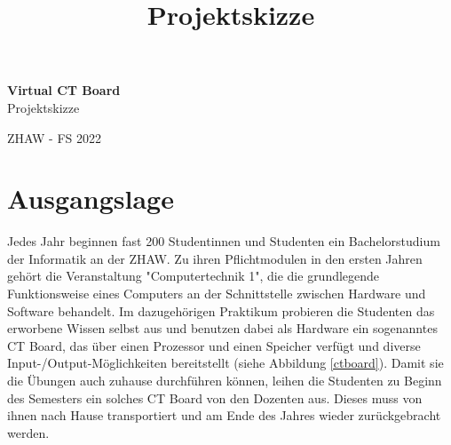 \documentclass[10pt]{article}
\title{Projektskizze}
\begin{document}
\begin{titlepage}

\raggedleft %
	
	\vspace*{\baselineskip} %
	
	
	\vspace*{0.167\textheight} %
	
	\textbf{\LARGE Virtual CT Board}\\[\baselineskip] %
	
	\Huge Projektskizze\\[\baselineskip] %
	
	\vfill %
	
	{\large ZHAW - FS 2022}
	
	\vspace*{3\baselineskip} %


\end{titlepage}

\tableofcontents

\newpage 

\section{Ausgangslage}

Jedes Jahr beginnen fast 200 Studentinnen und Studenten ein Bachelorstudium der Informatik an der ZHAW. Zu ihren Pflichtmodulen in den ersten Jahren gehört die Veranstaltung "Computertechnik 1", die die grundlegende Funktionsweise eines Computers an der Schnittstelle zwischen Hardware und Software behandelt. Im dazugehörigen Praktikum probieren die Studenten das erworbene Wissen selbst aus und benutzen dabei als Hardware ein sogenanntes CT Board, das über einen Prozessor und einen Speicher verfügt und diverse Input-/Output-Möglichkeiten bereitstellt (siehe Abbildung \ref{ctboard}). Damit sie die Übungen auch zuhause durchführen können, leihen die Studenten zu Beginn des Semesters ein solches CT Board von den Dozenten aus. Dieses muss von ihnen nach Hause transportiert und am Ende des Jahres wieder zurückgebracht werden.
\end{document}
